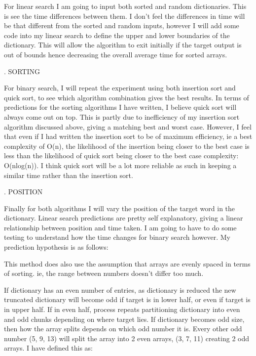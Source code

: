 \documentclass{article}
\begin{document}
For linear search I am going to input both sorted and random dictionaries. This is see the time differences between them. I don't feel the differences in time will be that different from the sorted and random inputs, however I will add some code into my linear search to define the upper and lower boundaries of the dictionary. This will allow the algorithm to exit initially if the target output is out of bounds hence decreasing the overall average time for sorted arrays.\par
.\newline
SORTING\newline


For binary search, I will repeat the experiment using both insertion sort and quick sort, to see which algorithm combination gives the best results. In terms of predictions for the sorting algorithms I have written, I believe quick sort will always come out on top. This is partly due to inefficiency of my insertion sort algorithm discussed above, giving a matching best and worst case. However, I feel that even if I had written the insertion sort to be of maximum efficiency, ie a best complexity of O(n), the likelihood of the insertion being closer to the best case is less than the likelihood of quick sort being closer to the best case complexity: O(nlog(n)). I think quick sort will be a lot more reliable as such in keeping a similar time rather than the insertion sort.\par
.\newline
POSITION\newline


Finally for both algorithms I will vary the position of the target word in the dictionary. Linear search predictions are pretty self explanatory, giving a linear relationship between position and time taken. I am going to have to do some testing to understand how the time changes for binary search however. My prediction hypothesis is as follows:\par

This method does also use the assumption that arrays are evenly spaced in terms of sorting. ie, the range between numbers doesn't differ too much.\par

If dictionary has an even number of entries, as dictionary is reduced the new truncated dictionary will become odd if target is in lower half, or even if target is in upper half. If in even half, process repeats partitioning dictionary into even and odd chunks depending on where target lies. If dictionary becomes odd size, then how the array splits depends on which odd number it is. Every other odd number (5, 9, 13) will split the array into 2 even arrays, (3, 7, 11) creating 2 odd arrays. I have defined this as:\par
\end{document}

